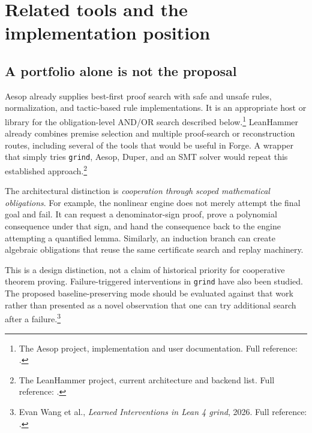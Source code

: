 \documentclass[11pt,letterpaper]{article}
\newcommand{\Forge}{\textsf{Forge}}
\newcommand{\grind}{\texttt{grind}}
\newcommand{\src}[2]{\footnote{#2. Full reference: \cite{#1}.}}
\theoremstyle{definition}
\theoremstyle{remark}
\begin{document}
\section{Related tools and the implementation position}
\subsection{A portfolio alone is not the proposal}
Aesop already supplies best-first proof search with safe and unsafe rules, normalization, and tactic-based rule implementations. It is an appropriate host or library for the obligation-level AND/OR search described below.\src{aesop}{The Aesop project, implementation and user documentation} LeanHammer already combines premise selection and multiple proof-search or reconstruction routes, including several of the tools that would be useful in \Forge{}. A wrapper that simply tries \grind{}, Aesop, Duper, and an SMT solver would repeat this established approach.\src{leanhammer}{The LeanHammer project, current architecture and backend list}

The architectural distinction is \emph{cooperation through scoped mathematical obligations}. For example, the nonlinear engine does not merely attempt the final goal and fail. It can request a denominator-sign proof, prove a polynomial consequence under that sign, and hand the consequence back to the engine attempting a quantified lemma. Similarly, an induction branch can create algebraic obligations that reuse the same certificate search and replay machinery.

This is a design distinction, not a claim of historical priority for cooperative theorem proving. Failure-triggered interventions in \grind{} have also been studied. The proposed baseline-preserving mode should be evaluated against that work rather than presented as a novel observation that one can try additional search after a failure.\src{interventions}{Evan Wang et al., \emph{Learned Interventions in Lean 4 grind}, 2026}
\end{document}
